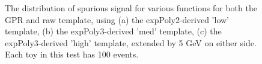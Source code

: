\begin{figure} 
\begin{center}

\caption{The distribution of spurious signal for various functions for both the GPR and raw template, using (a) the expPoly2-derived 'low' template, (b) the expPoly3-derived 'med' template, (c) the expPoly3-derived 'high' template, extended by 5 GeV on either side. Each toy in this test has 100 events.}
\label{fig:padded_lowpt_100_noSig}
\end{center}
\end{figure}

